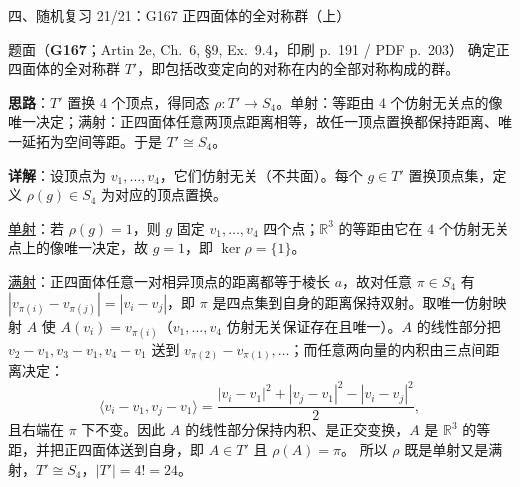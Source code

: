\documentclass[aspectratio=169,10pt,fontset=none]{ctexbeamer}
\newcommand{\ex}[1]{\textcolor{accent}{\footnotesize\bfseries #1}}
\newcommand{\key}[1]{\textcolor{ink}{\bfseries #1}}
\begin{document}
\begin{frame}[t]{四、随机复习 21/21：G167 正四面体的全对称群（上）}
\label{ex:G167}
\scriptsize
\begin{block}{\footnotesize 题面（\ex{G167}；Artin 2e, Ch.~6, \S9, Ex.~9.4，印刷 p.~191 / PDF p.~203）}
确定正四面体的全对称群 $T'$，即包括改变定向的对称在内的全部对称构成的群。
\end{block}
\key{思路}：$T'$ 置换 $4$ 个顶点，得同态 $\rho:T'\to S_4$。单射：等距由 $4$ 个仿射无关点的像唯一决定；满射：正四面体任意两顶点距离相等，故任一顶点置换都保持距离、唯一延拓为空间等距。于是 $T'\cong S_4$。

\key{详解}：设顶点为 $v_1,\dots,v_4$，它们仿射无关（不共面）。每个 $g\in T'$ 置换顶点集，定义 $\rho(g)\in S_4$ 为对应的顶点置换。

\underline{单射}：若 $\rho(g)=1$，则 $g$ 固定 $v_1,\dots,v_4$ 四个点；$\mathbb R^3$ 的等距由它在 $4$ 个仿射无关点上的像唯一决定，故 $g=1$，即 $\ker\rho=\{1\}$。

\underline{满射}：正四面体任意一对相异顶点的距离都等于棱长 $a$，故对任意 $\pi\in S_4$ 有 $|v_{\pi(i)}-v_{\pi(j)}|=|v_i-v_j|$，即 $\pi$ 是四点集到自身的距离保持双射。取唯一仿射映射 $A$ 使 $A(v_i)=v_{\pi(i)}$（$v_1,\dots,v_4$ 仿射无关保证存在且唯一）。$A$ 的线性部分把 $v_2-v_1,v_3-v_1,v_4-v_1$ 送到 $v_{\pi(2)}-v_{\pi(1)},\dots$；而任意两向量的内积由三点间距离决定：
\[ \langle v_i-v_1,v_j-v_1\rangle=\frac{|v_i-v_1|^2+|v_j-v_1|^2-|v_i-v_j|^2}{2}, \]
且右端在 $\pi$ 下不变。因此 $A$ 的线性部分保持内积、是正交变换，$A$ 是 $\mathbb R^3$ 的等距，并把正四面体送到自身，即 $A\in T'$ 且 $\rho(A)=\pi$。
所以 $\rho$ 既是单射又是满射，$T'\cong S_4$，$|T'|=4!=24$。
\end{frame}
\end{document}
